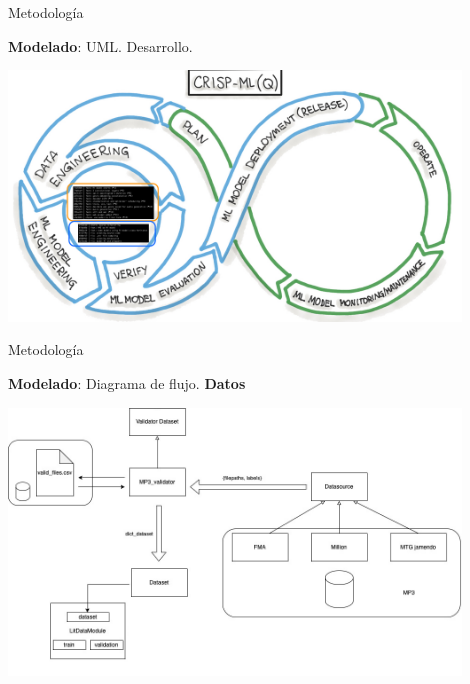 \documentclass{beamer}
\begin{document}
\begin{frame}{Metodología}
  \begin{center}
    \textbf{Modelado}: UML. Desarrollo.
  \end{center}
  \begin{center}
    \includegraphics[width=0.9\textwidth]{images/develop-crisp-ml-process.png}
  \end{center}
\end{frame}

\begin{frame}{Metodología}
  \begin{center}
    \textbf{Modelado}: Diagrama de flujo. \textbf{Datos}
  \end{center}
  \begin{center}
    \includegraphics[width=0.9\textwidth]{images/diagrama_flujo_datos.png}
  \end{center}
\end{frame}
\end{document}

